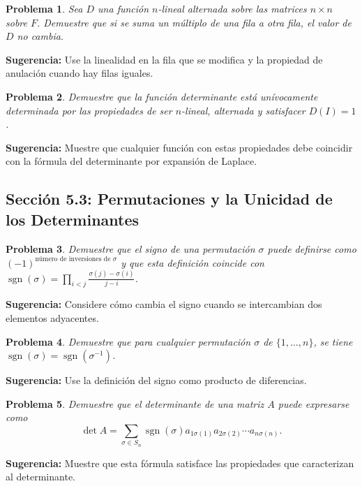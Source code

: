 \documentclass[12pt,a4paper]{article}
\newtheorem{problem}{Problema}
\newenvironment{suggestion}{\par\noindent\textbf{Sugerencia: }}{}
\begin{document}
\begin{problem}
Sea $D$ una función $n$-lineal alternada sobre las matrices $n\times n$ sobre $F$. Demuestre que si se suma un múltiplo de una fila a otra fila, el valor de $D$ no cambia.
\end{problem}
\begin{suggestion}
Use la linealidad en la fila que se modifica y la propiedad de anulación cuando hay filas iguales.
\end{suggestion}

\begin{problem}
Demuestre que la función determinante está unívocamente determinada por las propiedades de ser $n$-lineal, alternada y satisfacer $D(I)=1$.
\end{problem}
\begin{suggestion}
Muestre que cualquier función con estas propiedades debe coincidir con la fórmula del determinante por expansión de Laplace.
\end{suggestion}

\subsection{Sección 5.3: Permutaciones y la Unicidad de los Determinantes}

\begin{problem}
Demuestre que el signo de una permutación $\sigma$ puede definirse como $(-1)^{\text{número de inversiones de }\sigma}$ y que esta definición coincide con $\operatorname{sgn}(\sigma)=\prod_{i<j}\frac{\sigma(j)-\sigma(i)}{j-i}$.
\end{problem}
\begin{suggestion}
Considere cómo cambia el signo cuando se intercambian dos elementos adyacentes.
\end{suggestion}

\begin{problem}
Demuestre que para cualquier permutación $\sigma$ de $\{1,\dots,n\}$, se tiene $\operatorname{sgn}(\sigma)=\operatorname{sgn}(\sigma^{-1})$.
\end{problem}
\begin{suggestion}
Use la definición del signo como producto de diferencias.
\end{suggestion}

\begin{problem}
Demuestre que el determinante de una matriz $A$ puede expresarse como
\[
\det A = \sum_{\sigma\in S_n} \operatorname{sgn}(\sigma) a_{1\sigma(1)}a_{2\sigma(2)}\cdots a_{n\sigma(n)}.
\]
\end{problem}
\begin{suggestion}
Muestre que esta fórmula satisface las propiedades que caracterizan al determinante.
\end{suggestion}
\end{document}
